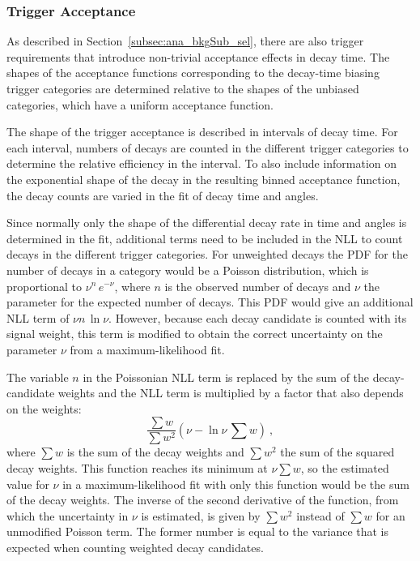 \subsubsection{Trigger Acceptance}
As described in Section~\ref{subsec:ana_bkgSub_sel}, there are also trigger requirements that introduce non-trivial acceptance effects in
decay time. The shapes of the acceptance functions corresponding to the decay-time biasing trigger categories are determined relative to
the shapes of the unbiased categories, which have a uniform acceptance function.

The shape of the trigger acceptance is described in intervals of decay time. For each interval, numbers of decays are counted in the
different trigger categories to determine the relative efficiency in the interval. To also include information on the exponential shape of
the decay in the resulting binned acceptance function, the decay counts are varied in the fit of decay time and angles.

Since normally only the shape of the differential decay rate in time and angles is determined in the fit, additional terms need to be
included in the NLL to count decays in the different trigger categories. For unweighted decays the PDF for the number of decays in a
category would be a Poisson distribution, which is proportional to $\nu^n\,e^{-\nu}$, where $n$ is the observed number of decays and $\nu$
the parameter for the expected number of decays. This PDF would give an additional NLL term of $\nu$\textminus$n\,\ln\nu$. However, because
each decay candidate is counted with its signal weight, this term is modified to obtain the correct uncertainty on the parameter $\nu$ from
a maximum-likelihood fit.

The variable $n$ in the Poissonian NLL term is replaced by the sum of the decay-candidate weights and the NLL term is multiplied by a
factor that also depends on the weights:
\begin{equation}
  \label{eq:weightPoisson}
  \frac{\sum w}{\sum w^2}\left( \nu - \ln\nu\,\sum w \right)\ ,
\end{equation}
where $\sum w$ is the sum of the decay weights and $\sum w^2$ the sum of the squared decay weights. This function reaches its minimum at
$\nu$\texteq$\sum w$, so the estimated value for $\nu$ in a maximum-likelihood fit with only this function would be the sum of the decay
weights. The inverse of the second derivative of the function, from which the uncertainty in $\nu$ is estimated, is given by $\sum w^2$
instead of $\sum w$ for an unmodified Poisson term. The former number is equal to the variance that is expected when counting weighted
decay candidates.


